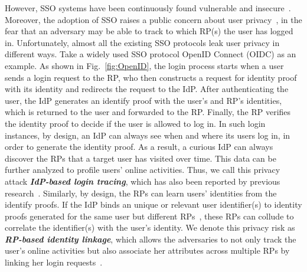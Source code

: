 However, SSO systems have been continuously found vulnerable and insecure~\cite{WangCW12,ccsSunB12,SomorovskyMSKJ12,ArmandoCCCPS13,DiscoveringJCS,dimvaLiM16,WangZLG16,MainkaMS16, MainkaMSW17,YangLCZ18}. Moreover, the adoption of SSO raises a public concern about user privacy~\cite{maler2008venn,NIST2017draft,BrowserID,SPRESSO}, in the fear that an adversary may be able to track to which RP(s) the user has logged in. Unfortunately, almost all the existing SSO protocols leak user privacy in different ways. Take a widely used SSO protocol OpenID Connect (OIDC) as an example. As shown in Fig.~\ref{fig:OpenID}, the login process starts when a user sends a login request to the RP, %
who then constructs a request for identity proof with its identity and redirects the request to the IdP. %
After authenticating the user, the IdP generates an identify proof with the user's and RP's identities, %
which is returned to the user and forwarded to the RP. %
Finally, the RP verifies the identity proof to decide if the user is allowed to log in. In such login instances, by design, an IdP can always see when and where its users log in, in order to generate the identity proof. As a result, a curious IdP can always discover the RPs that a target user has visited over time. This data can be further analyzed to profile users' online activities. Thus, we call this privacy attack \textbf{\em IdP-based login tracing}, which has also been reported by previous research~\cite{BrowserID,SPRESSO}. Similarly, by design, the RPs can learn users' identities from the identify proofs. If the IdP binds an unique or relevant user identifier(s) to identity proofs generated for the same user but different RPs~\cite{Google, FirefoxAccount}, these RPs can collude to correlate the identifier(s) with the user's identity. We denote this privacy risk as \textbf{\em RP-based identity linkage}, which allows the adversaries to not only track the user's online activities but also associate her attributes across multiple RPs by linking her login requests~\cite{maler2008venn}.

